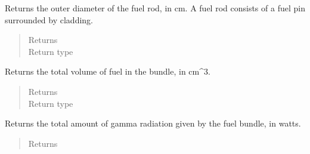 \documentclass[letterpaper,10pt,openany,oneside,english]{sphinxmanual}
\begin{document}
\begin{fulllineitems}
\begin{fulllineitems}
\end{fulllineitems}


\begin{fulllineitems}
\label{\detokenize{support_rst/fuel_bundle:fuel_bundle.FuelBundle.fuel_rod_od}}
Returns the outer diameter of the fuel rod, in cm.
A fuel rod consists of a fuel pin surrounded by cladding.
\begin{quote}\begin{description}
\item[{Returns}] \leavevmode
{}

\item[{Return type}] \leavevmode
{}

\end{description}\end{quote}

\end{fulllineitems}


\begin{fulllineitems}
\label{\detokenize{support_rst/fuel_bundle:fuel_bundle.FuelBundle.fuel_volume}}
Returns the total volume of fuel in the bundle, in cm\textasciicircum{}3.
\begin{quote}\begin{description}
\item[{Returns}] \leavevmode
{}

\item[{Return type}] \leavevmode
{}

\end{description}\end{quote}

\end{fulllineitems}


\begin{fulllineitems}
\label{\detokenize{support_rst/fuel_bundle:fuel_bundle.FuelBundle.gamma_pwr}}
Returns the total amount of gamma radiation given by the fuel bundle,
in watts.
\begin{quote}\begin{description}
\item[{Returns}] \leavevmode
{}


\end{description}
\end{quote}
\end{fulllineitems}
\end{fulllineitems}
\end{document}
